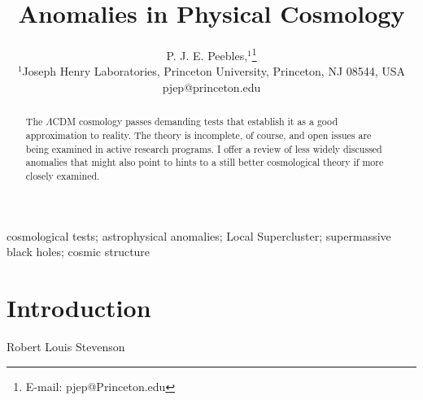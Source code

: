 \documentclass[fleqn,usenatbib]{mnras}
\title{Anomalies in Physical Cosmology}
\author[P. J. E. Peebles]{P. J. E. Peebles,$^{1}$\thanks{E-mail: pjep@Princeton.edu}\\
$^{1}$Joseph Henry Laboratories, Princeton University, Princeton, NJ 08544, USA\\
pjep@princeton.edu
}
\begin{document}
\maketitle 
\begin{abstract} 
The $\Lambda$CDM cosmology passes demanding tests that establish it as a good approximation to reality. The theory is incomplete, of course, and open issues are being examined in active research programs. I offer a review of less widely discussed anomalies that might also point to hints to a still better cosmological theory if more closely examined.
\end{abstract}
\begin{keywords}
{cosmological tests; astrophysical anomalies; Local Supercluster; supermassive black holes; cosmic structure}
\end{keywords}

\section{\bf Introduction}\label{intro}



{\qquad\qquad\qquad\qquad Robert Louis Stevenson}\medskip
\end{document}

